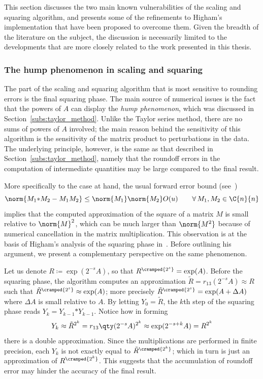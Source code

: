 This section discusses the two main known vulnerabilities of the scaling and squaring algorithm, and presents some of the refinements to Higham's implementation that have been proposed to overcome them. 
Given the breadth of the literature on the subject, the discussion is necessarily limited to the developments that are more closely related to the work presented in this thesis.

\subsubsection{The hump phenomenon in scaling and squaring}\label{subs:hump_sas}
The part of the scaling and squaring algorithm that is most sensitive to rounding errors is the final squaring phase. The main source of numerical issues is the fact that the powers of $A$ can display the \emph{hump phenomenon}, which was discussed in Section~\ref{subs:taylor_method}. Unlike the Taylor series method, there are no sums of powers of $A$ involved; the main reason behind the sensitivity of this algorithm is the sensitivity of the matrix product to perturbations in the data. The underlying principle, however, is the same as that described in Section~\ref{subs:taylor_method}, namely that the roundoff errors in the computation of intermediate quantities may be large compared to the final result. 

More specifically to the case at hand, the usual forward error bound (see~\cite[§~3.5]{higham:accuracy_book})
\begin{equation}\label{eqn:matmul_fwderr_bound}
	\norm{M_1\mathrm{*}M_2-M_1M_2}\le\norm{M_1}\norm{M_2}O(u)\qquad\forall\,M_1,M_2\in\C{n}{n}
\end{equation}
implies that the computed approximation of the square of a matrix $M$ is small relative to $\norm{M}^2$, which can be much larger than $\norm{M^2}$ because of numerical cancellation in the matrix multiplication. This observation is at the basis of Higham's analysis of the squaring phase in~\cite[§~10.3]{higham:matfun_book}. Before outlining his argument, we present a complementary perspective on the same phenomenon.
\smallskip 

Let us denote $R\coloneqq\exp(2^{-s}A)$, so that $R^{\cramped{2^s}}=\exp(A)$.  
Before the squaring phase, the algorithm computes an approximation $\tilde{R}=r_{13}(2^{-s}A)\approx R$ such that $\tilde{R}^{\cramped{2^s}}\approx\exp(A)$; more precisely $\tilde{R}^{\cramped{2^s}}=\exp(A+\Delta{A})$ where $\Delta{A}$ is small relative to $A$. 
By letting $Y_0=\tilde{R}$, the $k$th step of the squaring phase reads $Y_k=Y_{k-1}\mathtt{*}Y_{k-1}$.
Notice how in forming
\[
	Y_k\approx \tilde{R}^{2^k} = r_{13}\qty(2^{-s}A)^{2^k}\approx\exp(2^{-s+k}A)=R^{2^k}
\]
there is a double approximation. Since the multiplications are performed in finite precision, each $Y_k$ is not exactly equal to $\tilde{R}^{\cramped{2^k}}$; which in turn is just an approximation of $R^{\cramped{2^k}}$. This suggests that the accumulation of roundoff error may hinder the accuracy of the final result.

